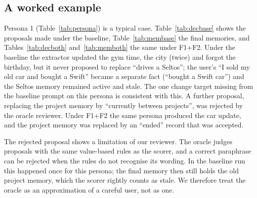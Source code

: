 \IfFileExists{IEEEtran.cls}{\documentclass[journal]{IEEEtran}\def\HAVEIEEE{1}}{\documentclass[10pt,twocolumn]{article}\usepackage[margin=0.7in,columnsep=0.25in]{geometry}}
\begin{document}
\subsection{A worked example}
\label{sec:example}
Persona 1 (Table~\ref{tab:persona}) is a typical case. Table~\ref{tab:decbase} shows the proposals made under the baseline, Table~\ref{tab:membase} the final memories, and Tables~\ref{tab:decboth} and~\ref{tab:memboth} the same under F1+F2. Under the baseline the extractor updated the gym time, the city (twice) and forgot the birthday, but it never proposed to replace ``drives a Seltos''; the user's ``I sold my old car and bought a Swift'' became a separate fact (``bought a Swift car'') and the Seltos memory remained active and stale. The one change target missing from the baseline prompt on this persona is consistent with this. A further proposal, replacing the project memory by ``currently between projects'', was rejected by the oracle reviewer. Under F1+F2 the same persona produced the car update, and the project memory was replaced by an ``ended'' record that was accepted.

The rejected proposal shows a limitation of our reviewer. The oracle judges proposals with the same value-based rules as the scorer, and a correct paraphrase can be rejected when the rules do not recognise its wording. In the baseline run this happened once for this persona; the final memory then still holds the old project memory, which the scorer rightly counts as stale. We therefore treat the oracle as an approximation of a careful user, not as one.

\begin{table}[t]
\centering\footnotesize
\caption{Persona 1, baseline: proposals under the gate.}
\label{tab:decbase}
\end{table}

\begin{table}[t]
\centering\footnotesize
\caption{Persona 1, baseline: final persona memories.}
\label{tab:membase}
\end{table}

\begin{table}[t]
\centering\footnotesize
\caption{Persona 1, F1+F2: proposals under the gate.}
\label{tab:decboth}
\end{table}

\begin{table}[t]
\centering\footnotesize
\caption{Persona 1, F1+F2: final persona memories.}
\label{tab:memboth}
\end{table}
\end{document}
